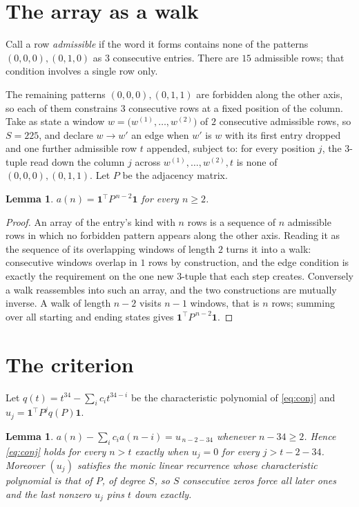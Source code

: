 \documentclass[11pt,a4paper]{article}
\theoremstyle{plain}
\newtheorem{lemma}[theorem]{Lemma}
\theoremstyle{definition}
\begin{document}
\section{The array as a walk}

Call a row \emph{admissible} if the word it forms contains none of the patterns
$(0,0,0), (0,1,0)$ as $3$ consecutive entries. There are $15$ admissible rows; that condition
involves a single row only.

The remaining patterns $(0,0,0), (0,1,1)$ are forbidden along the other axis, so each of them
constrains $3$ consecutive rows at a fixed position of the column. Take as state a
window $w=\bigl(w^{(1)},\dots,w^{(2)}\bigr)$ of $2$ consecutive admissible
rows, so $S=225$, and declare $w\to w'$ an edge when $w'$ is $w$ with its first entry
dropped and one further admissible row $t$ appended, subject to: for every position
$j$, the $3$-tuple read down the column $j$ across $w^{(1)},\dots,w^{(2)},t$
is none of $(0,0,0), (0,1,1)$. Let $P$ be the adjacency matrix.

\begin{lemma}\label{lem:walk}
$a(n)=\mathbf{1}^{\!\top}P^{\,n-2}\mathbf{1}$ for every $n\ge2$.
\end{lemma}

\begin{proof}
An array of the entry's kind with $n$ rows is a sequence of $n$ admissible rows in
which no forbidden pattern appears along the other axis. Reading it as the sequence of its
overlapping windows of length $2$ turns it into a walk: consecutive windows overlap in
$1$ rows by construction, and the edge condition is exactly the requirement on the one
new $3$-tuple that each step creates. Conversely a walk reassembles into such an array,
and the two constructions are mutually inverse. A walk of length $n-2$ visits $n-1$
windows, that is $n$ rows; summing over all starting and ending states gives
$\mathbf{1}^{\!\top}P^{\,n-2}\mathbf{1}$.
\end{proof}

\section{The criterion}

Let $q(t)=t^{34}-\sum_i c_i t^{34-i}$ be the characteristic polynomial of
\eqref{eq:conj} and $u_j=\mathbf{1}^{\!\top}P^{j}q(P)\mathbf{1}$.

\begin{lemma}\label{lem:crit}
$a(n)-\sum_i c_i a(n-i)=u_{\,n-2-34}$ whenever $n-34\ge2$. Hence
\eqref{eq:conj} holds for every $n>t$ exactly when $u_j=0$ for every
$j>t-2-34$. Moreover $(u_j)$ satisfies the monic linear recurrence whose
characteristic polynomial is that of $P$, of degree $S$, so $S$ consecutive zeros force all
later ones and the last nonzero $u_j$ pins $t$ down exactly.
\end{lemma}
\end{document}
